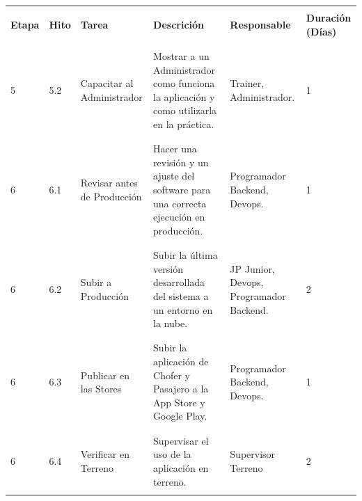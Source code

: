 \documentclass[12pt]{article}
\begin{document}
\newpage
\begin{table}[!h]
    \centering
    \begin{tabular}{|p{1.2cm}|p{1cm}|p{2cm}|p{5cm}|p{3cm}|p{2cm}|}
         \hline
         &&&&&\\
         \textbf{Etapa} & \textbf{Hito} & \textbf{Tarea} & \textbf{Descrición} & \textbf{Responsable} & \textbf{Duración (Días)}  \\
         &&&&&\\
         \hline
         &&&&&\\
         5 & 5.2 & Capacitar al Administrador & Mostrar a un Administrador como funciona la aplicación y como utilizarla en la práctica. & Trainer, Administrador. & 1\\
         &&&&&\\
         \hline
         &&&&&\\
         6 & 6.1 & Revisar antes de Producción & Hacer una revisión y un ajuste del software para una correcta ejecución en producción. & Programador Backend, Devops. & 1\\
         &&&&&\\
         \hline
         &&&&&\\
         6 & 6.2 & Subir a Producción & Subir la última versión desarrollada del sistema a un entorno en la nube. & JP Junior, Devops, Programador Backend. & 2\\
         &&&&&\\
         \hline
         &&&&&\\
         6 & 6.3 & Publicar en las Stores & Subir la aplicación de Chofer y Pasajero a la App Store y Google Play. & Programador Backend, Devops. & 1\\
         &&&&&\\
         \hline
         &&&&&\\
         6 & 6.4 & Verificar en Terreno & Supervisar el uso de la aplicación en terreno. & Supervisor Terreno & 2\\
         &&&&&\\
         \hline
    \end{tabular} 
\end{table}
\newpage
\end{document}
